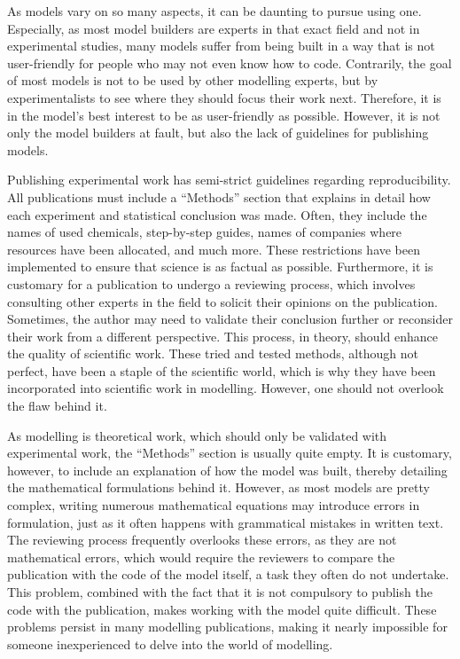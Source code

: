 \documentclass[11pt]{article}
\begin{document}
As models vary on so many aspects, it can be daunting to pursue using one. Especially, as most model builders are experts in that exact field and not in experimental studies, many models suffer from being built in a way that is not user-friendly for people who may not even know how to code. Contrarily, the goal of most models is not to be used by other modelling experts, but by experimentalists to see where they should focus their work next. Therefore, it is in the model's best interest to be as user-friendly as possible. However, it is not only the model builders at fault, but also the lack of guidelines for publishing models.

Publishing experimental work has semi-strict guidelines regarding reproducibility. All publications must include a “Methods” section that explains in detail how each experiment and statistical conclusion was made. Often, they include the names of used chemicals, step-by-step guides, names of companies where resources have been allocated, and much more. These restrictions have been implemented to ensure that science is as factual as possible. Furthermore, it is customary for a publication to undergo a reviewing process, which involves consulting other experts in the field to solicit their opinions on the publication. Sometimes, the author may need to validate their conclusion further or reconsider their work from a different perspective. This process, in theory, should enhance the quality of scientific work. These tried and tested methods, although not perfect, have been a staple of the scientific world, which is why they have been incorporated into scientific work in modelling. However, one should not overlook the flaw behind it.

As modelling is theoretical work, which should only be validated with experimental work, the “Methods” section is usually quite empty. It is customary, however, to include an explanation of how the model was built, thereby detailing the mathematical formulations behind it. However, as most models are pretty complex, writing numerous mathematical equations may introduce errors in formulation, just as it often happens with grammatical mistakes in written text. The reviewing process frequently overlooks these errors, as they are not mathematical errors, which would require the reviewers to compare the publication with the code of the model itself, a task they often do not undertake. This problem, combined with the fact that it is not compulsory to publish the code with the publication, makes working with the model quite difficult. These problems persist in many modelling publications, making it nearly impossible for someone inexperienced to delve into the world of modelling.
\end{document}
